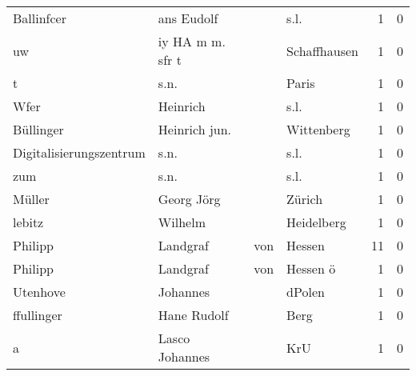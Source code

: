 \begin{center}
\begin{tiny}
\begin{longtabu}{llllrr}
               Ballinfcer &                         ans Eudolf &             &                                        s.l. &          1 &         0 \\
                       uw &                   iy HA m m. sfr t &             &                                Schaffhausen &          1 &         0 \\
                        t &                               s.n. &             &                                       Paris &          1 &         0 \\
                     Wfer &                           Heinrich &             &                                        s.l. &          1 &         0 \\
                Büllinger &                      Heinrich jun. &             &                                  Wittenberg &          1 &         0 \\
  Digitalisierungszentrum &                               s.n. &             &                                        s.l. &          1 &         0 \\
                      zum &                               s.n. &             &                                        s.l. &          1 &         0 \\
                   Müller &                         Georg Jörg &             &                                      Zürich &          1 &         0 \\
                   lebitz &                            Wilhelm &             &                                  Heidelberg &          1 &         0 \\
                  Philipp &                           Landgraf &         von &                                      Hessen &         11 &         0 \\
                  Philipp &                           Landgraf &         von &                                    Hessen ö &          1 &         0 \\
                 Utenhove &                           Johannes &             &                                      dPolen &          1 &         0 \\
               ffullinger &                        Hane Rudolf &             &                                        Berg &          1 &         0 \\
                        a &                     Lasco Johannes &             &                                         KrU &          1 &         0 \\

\end{longtabu}
\end{tiny}
\end{center}
